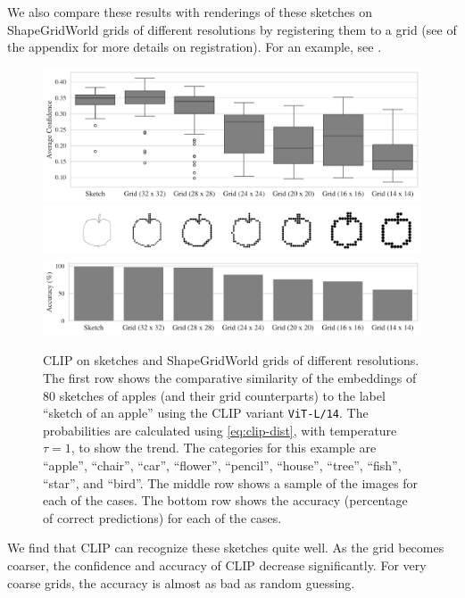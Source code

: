 We also compare these results with renderings of these sketches on ShapeGridWorld grids of different resolutions by registering them to a grid (see  of the appendix for more details on registration).
For an example, see .
\begin{figure}[h]
    \centering
    \includegraphics[width=\textwidth]{images/grid_comparison.pdf}
    \includegraphics[width=\textwidth]{images/grid_comparison_images.png}
    \includegraphics[width=\textwidth]{images/grid_comparison_accuracy.pdf}
    \caption[CLIP on sketches and ShapeGridWorld grids of different resolutions.]{CLIP on sketches and ShapeGridWorld grids of different resolutions.
    The first row shows the comparative similarity of the embeddings of \(80\) sketches of apples (and their grid counterparts) to the label ``sketch of an apple'' using the CLIP variant \texttt{ViT-L/14}.
    The probabilities are calculated using \eqref{eq:clip-dist}, with temperature \(\tau = 1\), to show the trend.
    The categories for this example are ``apple'', ``chair'', ``car'', ``flower'', ``pencil'', ``house'', ``tree'', ``fish'', ``star'', and ``bird''.
    The middle row shows a sample of the images for each of the cases.
    The bottom row shows the accuracy (percentage of correct predictions) for each of the cases.
    }
    \label{fig:clip-sketches}
\end{figure}
We find that CLIP can recognize these sketches quite well.
As the grid becomes coarser, the confidence and accuracy of CLIP decrease significantly.
For very coarse grids, the accuracy is almost as bad as random guessing.

